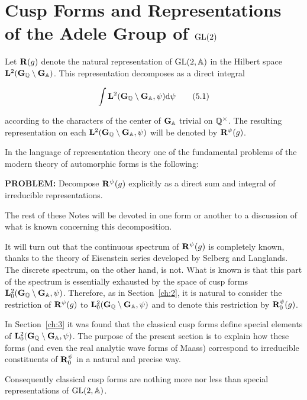 \chapter{Cusp Forms and Representations of the Adele Group of \texorpdfstring{$\operatorname{GL}(2)$}{GL(2)}}

\label{ch:5}

Let $\mathbf{R}(g)$ denote the natural representation of $\operatorname{GL}(2,\mathbb{A})$ in the Hilbert space $\mathbf{L}^2(\mathbf{G}_{\mathbb{Q}} \setminus \mathbf{G}_{\mathbb{A}})$. This representation decomposes as a direct integral

\begin{equation}\label{eq:5.1}
\int \mathbf{L}^2(\mathbf{G}_{\mathbb{Q}} \setminus \mathbf{G}_{\mathbb{A}}, \psi) \mathrm{d}\psi\tag{5.1}
\end{equation}

according to the characters of the center of $\mathbf{G}_{\mathbb{A}}$ trivial on $\mathbb{Q}^{\times}$. The resulting representation on each $\mathbf{L}^2(\mathbf{G}_{\mathbb{Q}} \setminus \mathbf{G}_{\mathbb{A}}, \psi)$ will be denoted by $\mathbf{R}^{\psi}(g)$.

In the language of representation theory one of the fundamental problems of the modern theory of automorphic forms is the following:

\textbf{PROBLEM:} Decompose $\mathbf{R}^{\psi}(g)$ explicitly as a direct sum and integral of irreducible representations.

The rest of these Notes will be devoted in one form or another to a discussion of what is known concerning this decomposition.

It will turn out that the continuous spectrum of $\mathbf{R}^{\psi}(g)$ is completely known, thanks to the theory of Eisenstein series developed by Selberg and Langlands. The discrete spectrum, on the other hand, is not. What is known is that this part of the spectrum is essentially exhausted by the space of cusp forms $\mathbf{L}_0^2(\mathbf{G}_{\mathbb{Q}} \setminus \mathbf{G}_{\mathbb{A}}, \psi)$. Therefore, as in Section~\ref{ch:2}, it is natural to consider the restriction of $\mathbf{R}^{\psi}(g)$ to $\mathbf{L}_0^2(\mathbf{G}_{\mathbb{Q}} \setminus \mathbf{G}_{\mathbb{A}}, \psi)$ and to denote this restriction by $\mathbf{R}_0^{\psi}(g)$.

In Section~\ref{ch:3} it was found that the classical cusp forms define special elements of $\mathbf{L}_0^2(\mathbf{G}_{\mathbb{Q}} \setminus \mathbf{G}_{\mathbb{A}}, \psi)$. The purpose of the present section is to explain how these forms (and even the real analytic wave forms of Maass) correspond to irreducible constituents of $\mathbf{R}_0^{\psi}$ in a natural and precise way.

Consequently classical cusp forms are nothing more nor less than special representations of $\operatorname{GL}(2,\mathbb{A})$.


